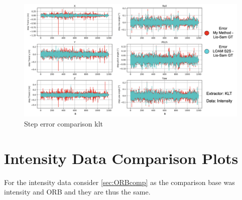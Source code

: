 {    \begin{figure}[ht]
        \centering
        \includegraphics[scale = 0.25]{images/results/step_error_klt.png}
        \caption{Step error comparison klt}
        \label{fig:step_error_comparison_klt_appendix}
    \end{figure}
    \clearpage
}



\section{Intensity Data Comparison Plots}{
    For the intensity data consider \cref{sec:ORBcomp} as the comparison base was intensity and ORB and they are thus the same.
}
